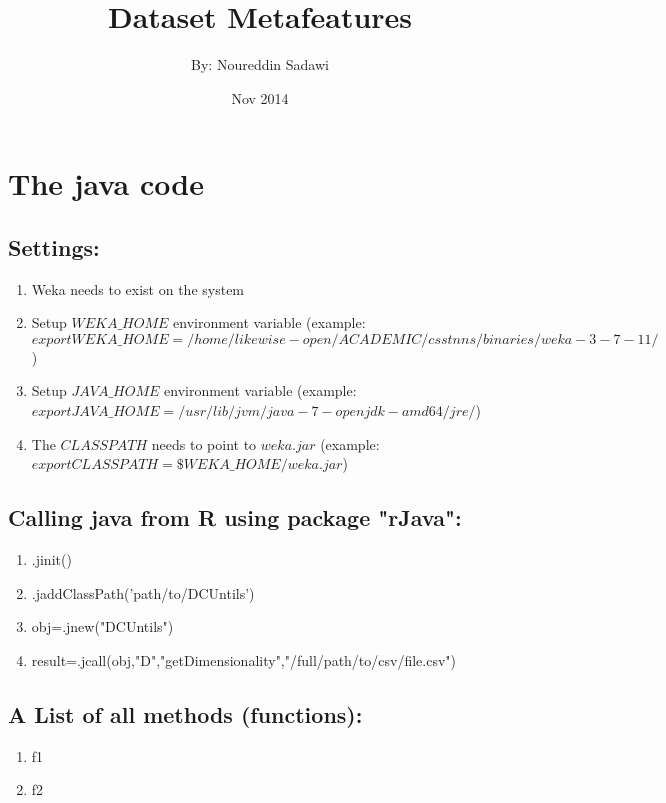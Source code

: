 \documentclass[a4paper,12pt, english]{article}
\begin{document}
\title{Dataset Metafeatures}
\date{Nov 2014}
\author{By: Noureddin Sadawi}
\maketitle

\large
\section{The java code}
\subsection{Settings:}
\begin{enumerate}
	\item Weka needs to exist on the system
	\item Setup $WEKA\_HOME$ environment variable (example: $export WEKA\_HOME=/home/likewise-open/ACADEMIC/csstnns/binaries/weka-3-7-11/$)
	\item Setup $JAVA\_HOME$ environment variable (example: $export JAVA\_HOME=/usr/lib/jvm/java-7-openjdk-amd64/jre/$)
	\item The $CLASSPATH$ needs to point to $weka.jar$ (example: $export CLASSPATH=\$WEKA\_HOME/weka.jar$)			
\end{enumerate} 

\subsection{Calling java from R using package "rJava":}
\begin{enumerate}
	\item .jinit()
	\item .jaddClassPath('path/to/DCUntils')
	\item obj=.jnew("DCUntils")
	\item result=.jcall(obj,"D","getDimensionality","/full/path/to/csv/file.csv")
\end{enumerate} 


\subsection{A List of all methods (functions):}
\begin{enumerate}
	\item f1
	\item f2
\end{enumerate}    
\end{document}
